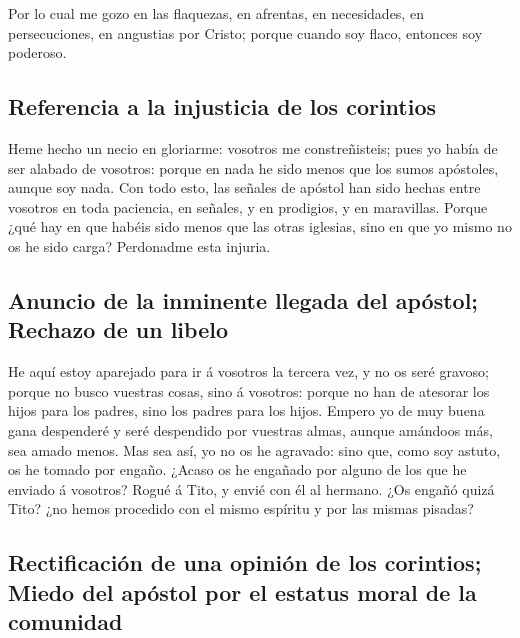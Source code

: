  Por lo cual me gozo en las flaquezas, en afrentas, en
necesidades, en persecuciones, en angustias por Cristo; porque cuando
soy flaco, entonces soy poderoso.

\hypertarget{referencia-a-la-injusticia-de-los-corintios}{%
\subsection{Referencia a la injusticia de los
corintios}\label{referencia-a-la-injusticia-de-los-corintios}}

 Heme hecho un necio en gloriarme: vosotros me
constreñisteis; pues yo había de ser alabado de vosotros: porque en nada
he sido menos que los sumos apóstoles, aunque soy nada. 
Con todo esto, las señales de apóstol han sido hechas entre vosotros en
toda paciencia, en señales, y en prodigios, y en maravillas.
 Porque ¿qué hay en que habéis sido menos que las otras
iglesias, sino en que yo mismo no os he sido carga? Perdonadme esta
injuria.

\hypertarget{anuncio-de-la-inminente-llegada-del-apuxf3stol-rechazo-de-un-libelo}{%
\subsection{Anuncio de la inminente llegada del apóstol; Rechazo de un
libelo}\label{anuncio-de-la-inminente-llegada-del-apuxf3stol-rechazo-de-un-libelo}}

 He aquí estoy aparejado para ir á vosotros la tercera
vez, y no os seré gravoso; porque no busco vuestras cosas, sino á
vosotros: porque no han de atesorar los hijos para los padres, sino los
padres para los hijos.  Empero yo de muy buena gana
despenderé y seré despendido por vuestras almas, aunque amándoos más,
sea amado menos.  Mas sea así, yo no os he agravado: sino
que, como soy astuto, os he tomado por engaño.  ¿Acaso os
he engañado por alguno de los que he enviado á vosotros? 
Rogué á Tito, y envié con él al hermano. ¿Os engañó quizá Tito? ¿no
hemos procedido con el mismo espíritu y por las mismas pisadas?

\hypertarget{rectificaciuxf3n-de-una-opiniuxf3n-de-los-corintios-miedo-del-apuxf3stol-por-el-estatus-moral-de-la-comunidad}{%
\subsection{Rectificación de una opinión de los corintios; Miedo del
apóstol por el estatus moral de la
comunidad}\label{rectificaciuxf3n-de-una-opiniuxf3n-de-los-corintios-miedo-del-apuxf3stol-por-el-estatus-moral-de-la-comunidad}}

